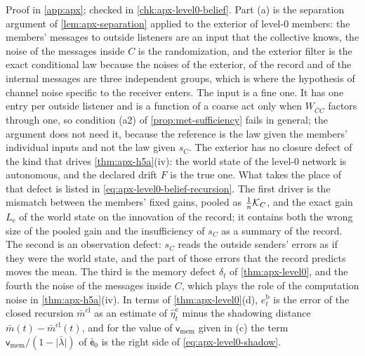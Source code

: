 Proof in \cref{app:apx}; checked in \cref{chk:apx-level0-belief}. Part (a) is the separation argument of \cref{lem:apx-separation} applied to the exterior of level-0 members: the members' messages to outside listeners are an input that the collective knows, the noise of the messages inside $C$ is the randomization, and the exterior filter is the exact conditional law because the noises of the exterior, of the record and of the internal messages are three independent groups, which is where the hypothesis of channel noise specific to the receiver enters. The input is a fine one. It has one entry per outside listener and is a function of a coarse act only when $W_{\bar CC}$ factors through one, so condition (a2) of \cref{prop:met-sufficiency} fails in general; the argument does not need it, because the reference is the law given the members' individual inputs and not the law given $s_C$. The exterior has no closure defect of the kind that drives \cref{thm:apx-h5a}(iv): the world state of the level-0 network is autonomous, and the declared drift $F$ is the true one. What takes the place of that defect is listed in \eqref{eq:apx-level0-belief-recursion}. The first driver is the mismatch between the members' fixed gains, pooled as $\frac1n\mathcal{K}_C$, and the exact gain $L_{\mathrm e}$ of the world state on the innovation of the record; it contains both the wrong size of the pooled gain and the insufficiency of $s_C$ as a summary of the record. The second is an observation defect: $s_C$ reads the outside senders' errors as if they were the world state, and the part of those errors that the record predicts moves the mean. The third is the memory defect $\delta_t$ of \cref{thm:apx-level0}, and the fourth the noise of the messages inside $C$, which plays the role of the computation noise in \cref{thm:apx-h5a}(iv). In terms of \cref{thm:apx-level0}(d), $e^{\mathrm b}_t$ is the error of the closed recursion $\bar m^{\mathrm{cl}}$ as an estimate of $\hat\eta^{\mathrm e}_t$ minus the shadowing distance $\bar m(t)-\bar m^{\mathrm{cl}}(t)$, and for the value of $\mathsf v_{\mathrm{mem}}$ given in (c) the term $\mathsf v_{\mathrm{mem}}/(1-\lvert\bar\lambda\rvert)$ of $\bar{\mathsf e}_0$ is the right side of \eqref{eq:apx-level0-shadow}.

